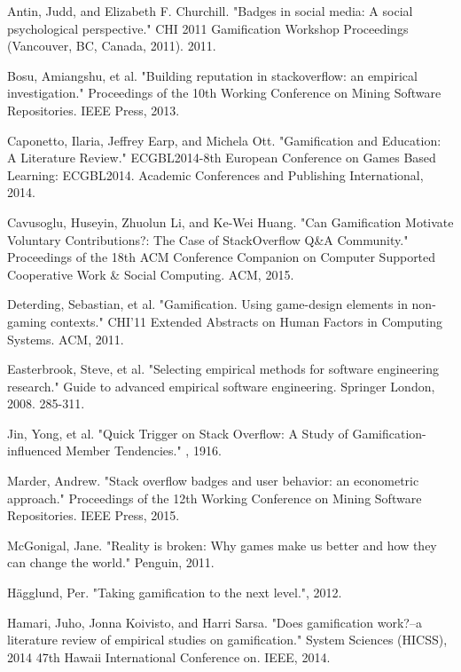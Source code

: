 \documentclass{sigchi}
\begin{document}
% 
% 

\begin{thebibliography}{9}

Antin, Judd, and Elizabeth F. Churchill. "Badges in social media: A social psychological perspective." CHI 2011 Gamification Workshop Proceedings (Vancouver, BC, Canada, 2011). 2011.

Bosu, Amiangshu, et al. "Building reputation in stackoverflow: an empirical investigation." Proceedings of the 10th Working Conference on Mining Software Repositories. IEEE Press, 2013.

Caponetto, Ilaria, Jeffrey Earp, and Michela Ott. "Gamification and Education: A Literature Review." ECGBL2014-8th European Conference on Games Based Learning: ECGBL2014. Academic Conferences and Publishing International, 2014.

Cavusoglu, Huseyin, Zhuolun Li, and Ke-Wei Huang. "Can Gamification Motivate Voluntary Contributions?: The Case of StackOverflow Q\&A Community." Proceedings of the 18th ACM Conference Companion on Computer Supported Cooperative Work \& Social Computing. ACM, 2015.

Deterding, Sebastian, et al. "Gamification. Using game-design elements in non-gaming contexts." CHI'11 Extended Abstracts on Human Factors in Computing Systems. ACM, 2011.

Easterbrook, Steve, et al. "Selecting empirical methods for software engineering research." Guide to advanced empirical software engineering. Springer London, 2008. 285-311.

Jin, Yong, et al. "Quick Trigger on Stack Overflow: A Study of Gamification-influenced Member Tendencies." , 1916.

Marder, Andrew. "Stack overflow badges and user behavior: an econometric approach." Proceedings of the 12th Working Conference on Mining Software Repositories. IEEE Press, 2015.

McGonigal, Jane. "Reality is broken: Why games make us better and how they can change the world." Penguin, 2011.

Hägglund, Per. "Taking gamification to the next level.", 2012.

Hamari, Juho, Jonna Koivisto, and Harri Sarsa. "Does gamification work?--a literature review of empirical studies on gamification." System Sciences (HICSS), 2014 47th Hawaii International Conference on. IEEE, 2014.


\end{thebibliography}
\end{document}
